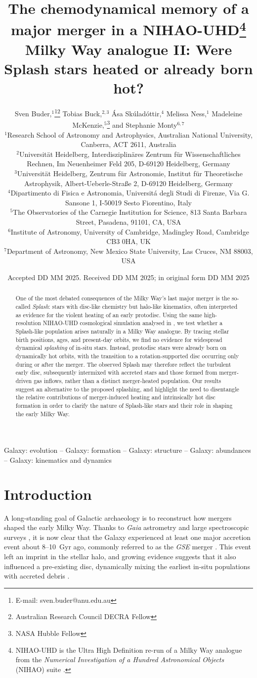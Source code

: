 \documentclass[fleqn,usenatbib]{mnras}
\title[Were Splash stars heated or already born hot?]{The chemodynamical memory of a major merger in a NIHAO-UHD\thanks{NIHAO-UHD is the Ultra High Definition re-run of a Milky Way analogue from the \textit{Numerical Investigation of a Hundred Astronomical Objects} (NIHAO) suite \citep{Wang2015}.} Milky Way analogue II: Were Splash stars heated or already born hot?}
\author[S. Buder et al.]{Sven Buder,$^{1}$\thanks{E-mail: sven.buder@anu.edu.au}\thanks{Australian Research Council DECRA Fellow}\orcidlink{0000-0002-4031-8553}
Tobias Buck,$^{2,3}$\orcidlink{0000-0003-2027-399X}
Ása Skúladóttir,$^{4}$\orcidlink{0000-0001-9155-9018}
Melissa Ness,$^{1}$\orcidlink{0000-0001-5082-6693}
Madeleine McKenzie,$^{5}$\thanks{NASA Hubble Fellow}\orcidlink{0000-0002-1715-1257}
and\newauthor
Stephanie Monty$^{6, 7}$\orcidlink{0000-0002-9225-5822}
\\
$^{1}$Research School of Astronomy and Astrophysics, Australian National University, Canberra, ACT 2611, Australia\\
$^{2}$Universit{\"a}t Heidelberg, Interdisziplin{\"a}res Zentrum f{\"u}r Wissenschaftliches Rechnen, Im Neuenheimer Feld 205, D-69120 Heidelberg, Germany\\
$^{3}$Universit{\"a}t Heidelberg, Zentrum f{\"u}r Astronomie, Institut f{\"u}r Theoretische Astrophysik, Albert-Ueberle-Straße 2, D-69120 Heidelberg, Germany\\
$^{4}$Dipartimento di Fisica e Astronomia, Universitá degli Studi di Firenze, Via G. Sansone 1, I-50019 Sesto Fiorentino, Italy\\
$^{5}$The Observatories of the Carnegie Institution for Science, 813 Santa Barbara Street, Pasadena, 91101, CA, USA\\
$^{6}$Institute of Astronomy, University of Cambridge, Madingley Road, Cambridge CB3 0HA, UK\\
$^{7}$Department of Astronomy, New Mexico State University, Las Cruces, NM 88003, USA
}
\date{Accepted DD MM 2025. Received DD MM 2025; in original form DD MM 2025}
\begin{document}
\label{firstpage}
\pagerange{\pageref{firstpage}--\pageref{lastpage}}
\maketitle

\begin{abstract} %
One of the most debated consequences of the Milky Way’s last major merger is the so-called \textit{Splash}: stars with disc-like chemistry but halo-like kinematics, often interpreted as evidence for the violent heating of an early protodisc. Using the same high-resolution NIHAO-UHD cosmological simulation analysed in , we test whether a Splash-like population arises naturally in a Milky Way analogue. By tracing stellar birth positions, ages, and present-day orbits, we find no evidence for widespread dynamical \textit{splashing} of in-situ stars. Instead, protodisc stars were already born on dynamically hot orbits, with the transition to a rotation-supported disc occurring only during or after the merger. The observed Splash may therefore reflect the turbulent early disc, subsequently intermixed with accreted stars and those formed from merger-driven gas inflows, rather than a distinct merger-heated population. Our results suggest an alternative to the proposed splashing, and highlight the need to disentangle the relative contributions of merger-induced heating and intrinsically hot disc formation in order to clarify the nature of Splash-like stars and their role in shaping the early Milky Way.
\end{abstract}

\begin{keywords}
Galaxy: evolution -- Galaxy: formation -- Galaxy: structure -- Galaxy: abundances -- Galaxy: kinematics and dynamics
\end{keywords}


\section{Introduction}
\label{sec:introduction}

A long-standing goal of Galactic archaeology is to reconstruct how mergers shaped the early Milky Way. Thanks to \textit{Gaia} astrometry \citep{Brown2021b} and large spectroscopic surveys \citep{Jofre2019}, it is now clear that the Galaxy experienced at least one major accretion event about 8--10~Gyr ago, commonly referred to as the \textit{GSE} merger \citep{Belokurov2018, Helmi2018, Naidu2020}. This event left an imprint in the stellar halo, and growing evidence suggests that it also influenced a pre-existing disc, dynamically mixing the earliest in-situ populations with accreted debris \citep{Helmi2020}.
\end{document}
